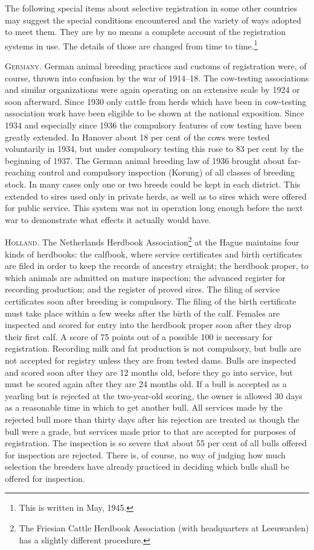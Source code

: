 The following special items about selective registration in some
other countries may suggest the special conditions encountered and the
variety of ways adopted to meet them. They are by no means a complete
account of the registration systems in use. The details of those are
changed from time to time.\footnote{This is written in May, 1945.}

\textsc{Germany}. German animal breeding practices and customs of registration
were, of course, thrown into confusion by the war of 1914--18.
The cow-testing associations and similar organizations were again
operating on an extensive scale by 1924 or soon afterward. Since 1930
only cattle from herds which have been in cow-testing association work
have been eligible to be shown at the national exposition. Since 1934
and especially since 1936 the compulsory features of cow testing have
been greatly extended. In Hanover about 18 per cent of the cows were
tested voluntarily in 1934, but under compulsory testing this rose to 83
per cent by the beginning of 1937. The German animal breeding law
of 1936 brought about far-reaching control and compulsory inspection
(Korung) of all classes of breeding stock. In many cases only one or two
breeds could be kept in each district. This extended to sires used only
in private herds, as well as to sires which were offered for public service.
This system was not in operation long enough before the next war to
demonstrate what effects it actually would have.

\textsc{Holland}. The Netherlands Herdbook Association\footnote{The Friesian
Cattle Herdbook Association (with headquarters at Leeuwarden) has a slightly
different procedure.} at the Hague maintains four kinds of herdbooks: the
calfbook, where service certificates and birth certificates are filed in
order to keep the records of ancestry straight; the herdbook proper, to which
animals are admitted on mature inspection; the advanced register for recording
production; and the register of proved sires. The filing of service certificates
soon after breeding is compulsory. The filing of the birth certificate must take
place within a few weeks after the birth of the calf. Females are
inspected and scored for entry into the herdbook proper soon after they
drop their first calf. A score of 75 points out of a possible 100 is necessary
for registration. Recording milk and fat production is not compulsory,
but bulls are not accepted for registry unless they are from
tested dams. Bulls are inspected and scored soon after they are 12
months old, before they go into service, but must be scored again after
they are 24 months old. If a bull is accepted as a yearling but is rejected
at the two-year-old scoring, the owner is allowed 30 days as a reasonable
time in which to get another bull. All services made by the rejected bull
more than thirty days after his rejection are treated as though the bull
were a grade, but services made prior to that are accepted for purposes
of registration. The inspection is so severe that about 55 per cent of all
bulls offered for inspection are rejected. There is, of course, no way of
judging how much selection the breeders have already practiced in
deciding which bulls shall be offered for inspection.

